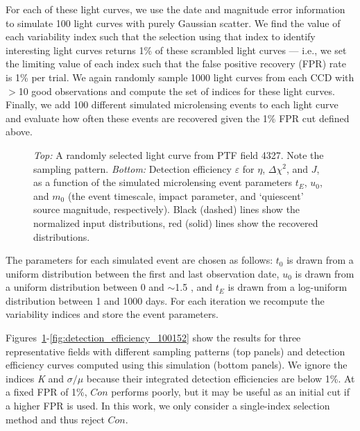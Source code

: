 \documentclass{emulateapj}
\begin{document}
For each of these light curves, we use the date and magnitude error information to simulate 100 light curves with purely Gaussian scatter. We find the value of each variability index such that the selection using that index to identify interesting light curves returns 1\% of these scrambled light curves --- i.e., we set the limiting value of each index such that the false positive recovery (FPR) rate is 1\% per trial. We again randomly sample 1000 light curves from each CCD with $>$10 good observations and compute the set of indices for these light curves. Finally, we add 100 different simulated microlensing events to each light curve and evaluate how often these events are recovered given the 1\% FPR cut defined above. 

\begin{figure}
\centering
	
\caption{{\it Top:} A randomly selected light curve from PTF field 4327. Note the sampling pattern. {\it Bottom:} Detection efficiency $\varepsilon$ for $\eta$, $\Delta\chi^2$, and $J$, as a function of the simulated microlensing event parameters $t_E$, $u_0$, and $m_0$ (the event timescale, impact parameter, and `quiescent' source magnitude, respectively). Black (dashed) lines show the normalized input distributions, red (solid) lines show the recovered distributions.}  \label{fig:detection_efficiency_4327}
\end{figure}

The parameters for each simulated event are chosen as follows: $t_0$ is drawn from a uniform distribution between the first and last observation date, $u_0$ is drawn from a uniform distribution between 0 and $\sim$1.5 \citep[the impact parameter that causes a maximum deviation larger than $\sim$$5\sigma$ for a $R\sim17.5$ mag source; e.g.,][]{macho_detection_efficiency}, and $t_E$ is drawn from a log-uniform distribution between 1 and 1000 days. For each iteration we recompute the variability indices and store the event parameters. 

Figures~\ref{fig:detection_efficiency_4327}-\ref{fig:detection_efficiency_100152} show the results for three representative fields with different sampling patterns (top panels) and detection efficiency curves computed using this simulation (bottom panels). We ignore the indices \textit{K} and $\sigma/\mu$ because their integrated detection efficiencies are below 1\%. At a fixed FPR of 1\%, $Con$ performs poorly, but it may be useful as an initial cut if a higher FPR is used. In this work, we only consider a single-index selection method and thus reject $Con$. 
\end{document}
